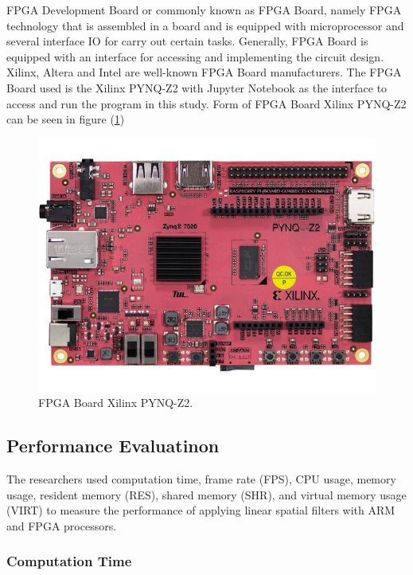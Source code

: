 FPGA Development Board or commonly known as FPGA Board, namely FPGA technology that is assembled in a board and is equipped with microprocessor and several interface IO for carry out certain tasks. Generally, FPGA Board is equipped with an interface for accessing and implementing the circuit design. Xilinx, Altera and Intel are well-known FPGA Board manufacturers. The FPGA Board used is the Xilinx PYNQ-Z2 with Jupyter Notebook as the interface to access and run the program in this study. Form of FPGA Board Xilinx PYNQ-Z2 can be seen in figure (\ref{fig:pynq-z2})

\begin{figure}[ht]
    \includegraphics[width=0.8\linewidth, center]{images/pynq-z2.jpeg}
    \caption{FPGA Board Xilinx PYNQ-Z2.}
    \label{fig:pynq-z2}
\end{figure}


\subsection{Performance Evaluatinon}

The researchers used computation time, frame rate (FPS), CPU usage, memory usage, resident memory (RES), shared memory (SHR), and virtual memory usage (VIRT) to measure the performance of applying linear spatial filters with ARM and FPGA processors.

\subsubsection{Computation Time}

